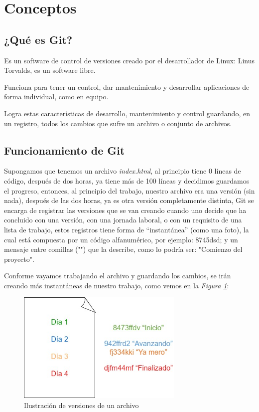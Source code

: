 \section{Conceptos}


\subsection{¿Qué es Git?}

Es un software de control de versiones creado por el desarrollador de Linux: Linus Torvalds, es un software libre.

Funciona para tener un control, dar mantenimiento y desarrollar aplicaciones de forma individual, como en equipo.

Logra estas características de  desarrollo, mantenimiento y control guardando, en un registro, todos los cambios que sufre un archivo o conjunto de archivos.


\subsection{Funcionamiento de Git}

Supongamos que tenemos un archivo \textit{index.html}, al principio tiene 0 líneas de código, después de dos horas, ya tiene más de 100 líneas y decidimos guardamos el progreso, entonces, al principio del trabajo, nuestro archivo era una versión (sin nada), después de las dos horas, ya es otra versión completamente distinta, Git se encarga de registrar las versiones que se van creando cuando uno decide que ha concluido con una versión, con una jornada laboral, o con un requisito de una lista de trabajo, estos registros tiene forma de “instantánea” (como una foto), la cual está compuesta por un código alfanumérico, por ejemplo: 8745dsd; y un mensaje entre comillas ("") que la describe, como lo podría ser: "Comienzo del proyecto".

Conforme vayamos trabajando el archivo y guardando los cambios, se irán creando más instantáneas de nuestro trabajo, como vemos en la \textit{Figura \ref{fig: 1}}:
\begin{figure}[H]
    \centering
    \caption{Ilustración de versiones de un archivo}
    \label{fig: 1}
    \includegraphics[width=8cm]{conceptos/g1.jpg}
\end{figure}

